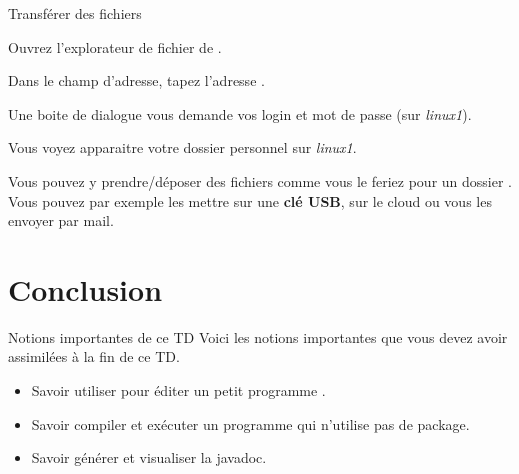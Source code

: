 \documentclass[a4paper,11pt]{style-esi/td}
\begin{document}
	\begin{Tutoriel}{Transférer des fichiers}
	\begin{steps}		
		\item 
			Ouvrez l'explorateur de fichier de .
		\item 
			Dans le champ d'adresse, tapez l'adresse .
		\item 
			Une boite de dialogue vous demande vos login et mot de passe (sur \textit{linux1}).
		\item 
			Vous voyez apparaitre votre dossier personnel sur \textit{linux1}. 
		\item 
			Vous pouvez y prendre/déposer des fichiers comme vous le 
			feriez pour un dossier . 
			Vous pouvez par exemple les mettre sur une \textbf{clé USB},
			sur le cloud ou vous les envoyer par mail.
	\end{steps}
	\end{Tutoriel}			

\section{Conclusion}

	\begin{theorie}{Notions importantes de ce TD}
		Voici les notions importantes que vous devez avoir assimilées à la fin de ce TD.
		\begin{itemize}
		\item 
			Savoir utiliser  pour éditer un petit programme .
		\item 
			Savoir compiler et exécuter un programme  
			qui n'utilise pas de package.
		\item 
			Savoir générer et visualiser la javadoc.
		\end{itemize}
	\end{theorie}


		
\end{document}
